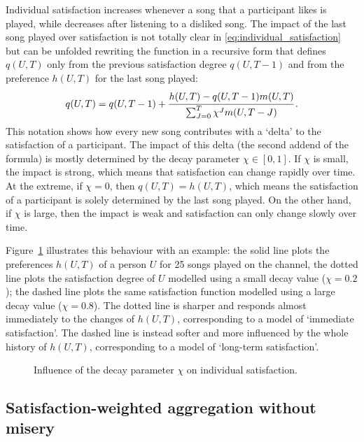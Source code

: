 Individual satisfaction increases whenever a song that a participant likes is played, while decreases after listening to a disliked song.
The impact of the last song played over satisfaction is not totally clear in  \eqref{eq:individual_satisfaction} but can be unfolded rewriting the function in a recursive form that defines $q(U,T)$ only from the previous satisfaction degree %
$q(U,T-1)$ and from the preference $h(U,T)$ for the last song played:
\begin{equation}
   q(U,T) = q(U,T-1) + \cfrac{h(U,T) - q(U,T-1) m(U,T)} {\sum_{J=0}^{T} \chi^J m(U,T-J)} \,.
\end{equation}
This notation shows how every new song contributes with a `delta' to the satisfaction of a participant.
The impact of this delta (the second addend of the formula) is mostly determined by the decay parameter $\chi \in [0,1]$.
%
If $\chi$ is small, the impact is strong, which means that satisfaction can change rapidly over time. 
At the extreme, if $\chi = 0$, then $q(U,T) = h(U,T)$, which means the satisfaction of a participant is solely determined by the last song played.
%
On the other hand, if $\chi$ is large, then the impact is weak and satisfaction can only change slowly over time.

Figure~\ref{fig:satisfaction_decay} illustrates this behaviour with an example: 
the %
solid line plots the preferences $h(U,T)$ of a person $U$ for 25 songs played on the channel, 
the %
dotted line plots the satisfaction degree of $U$ modelled using a small decay value ($\chi = 0.2$);
the %
dashed line plots the same satisfaction function modelled using a large decay value ($\chi = 0.8$). 
The dotted line is sharper and responds almost immediately to the changes of $h(U,T)$, corresponding to a model of `immediate satisfaction'.
The dashed line is instead softer and more influenced by the whole history of $h(U,T)$, corresponding to a model of `long-term satisfaction'.
%
\begin{figure}[bthp]
\centering \setlength{\abovecaptionskip}{3pt}
\caption{Influence of the decay parameter $\chi$ on individual satisfaction.}
\label{fig:satisfaction_decay}
\end{figure}


\subsection{Satisfaction-weighted aggregation without misery} %
\label{sub:how_we_fairly_aggregate_preferences}

